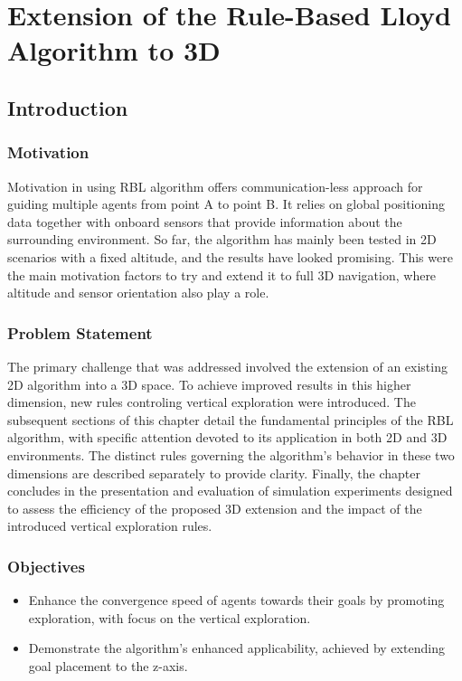 \chapter{Extension of the Rule-Based Lloyd Algorithm to 3D\label{chap:rbl}}
\section{Introduction}
    \subsection{Motivation}
        Motivation in using \ac{RBL} algorithm offers communication-less approach for guiding multiple agents from point A to point B.
        It relies on global positioning data together with onboard sensors that provide information about the surrounding environment.
        So far, the algorithm has mainly been tested in 2D scenarios with a fixed altitude, and the results have looked promising. 
        This were the main motivation factors to try and extend it to full 3D navigation, where altitude and sensor orientation also play a role.

    \subsection{Problem Statement}
        The primary challenge that was addressed involved the extension of an existing 2D algorithm into a 3D space. 
        To achieve improved results in this higher dimension, new rules controling vertical exploration were introduced. 
        The subsequent sections of this chapter detail the fundamental principles of the \ac{RBL} algorithm, with specific attention devoted to its application in both 2D and 3D environments. 
        The distinct rules governing the algorithm's behavior in these two dimensions are described separately to provide clarity. 
        Finally, the chapter concludes in the presentation and evaluation of simulation experiments designed to assess the efficiency of the proposed 3D extension and the impact of the introduced vertical exploration rules.

    \subsection{Objectives}
        \begin{itemize}
            \item   Enhance the convergence speed of agents towards their goals by promoting exploration, with  focus on the vertical exploration.
            \item   Demonstrate the algorithm's enhanced applicability, achieved by extending goal placement to the z-axis.
        \end{itemize}

